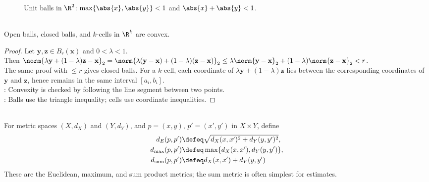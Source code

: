 \begin{figure}[htbp]
  \centering
  
  \caption{Unit balls in $\R^2$: \textcolor{blue!60!black}{$\max\{\abs{x},\abs{y}\}<1$} and \textcolor{orange!80!black}{$\abs{x}+\abs{y}<1$}.}
  \label{fig:product-metric-unit-balls}
\end{figure}

\begin{proposition} \label{prop:balls-and-cells-convex} \\
Open balls, closed balls, and $k$-cells in $\R^k$ are convex.
\begin{proof}
Let $\mathbf{y},\mathbf{z}\in B_r(\mathbf{x})$ and $0<\lambda<1$.\\
Then $\norm{\lambda\mathbf{y}+(1-\lambda)\mathbf{z}-\mathbf{x}}_2 =\norm{\lambda(\mathbf{y}-\mathbf{x})+(1-\lambda)(\mathbf{z}-\mathbf{x})}_2 \leq \lambda\norm{\mathbf{y}-\mathbf{x}}_2+(1-\lambda)\norm{\mathbf{z}-\mathbf{x}}_2<r$.\\
The same proof with $\leq r$ gives closed balls. For a $k$-cell, each coordinate of $\lambda\mathbf{y}+(1-\lambda)\mathbf{z}$ lies between the corresponding coordinates of $\mathbf{y}$ and $\mathbf{z}$, hence remains in the same interval $[a_i,b_i]$.\\
: Convexity is checked by following the line segment between two points.\\
: Balls use the triangle inequality; cells use coordinate inequalities.
\end{proof}
\end{proposition}

\begin{definition} \label{def:product-metrics} \\
For metric spaces $(X,d_X)$ and $(Y,d_Y)$, and $p=(x,y)$, $p'=(x',y')$ in $X\times Y$, define
\begin{align}
d_E(p,p')&\defeq\sqrt{d_X(x,x')^2+d_Y(y,y')^2},\nonumber \\
d_{\max}(p,p')&\defeq\max\{d_X(x,x'),d_Y(y,y')\},\nonumber \\
d_{\mathrm{sum}}(p,p')&\defeq d_X(x,x')+d_Y(y,y') \nonumber
\end{align}
These are the Euclidean, maximum, and sum product metrics; the sum metric is often simplest for estimates.
\end{definition}

